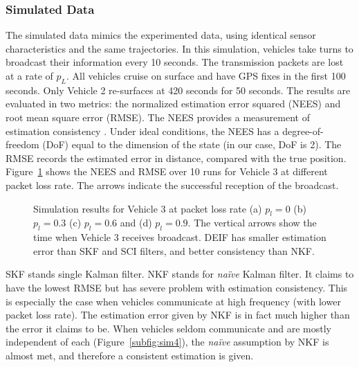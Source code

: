 \subsubsection{Simulated Data}

The simulated data mimics the experimented data, using identical sensor characteristics and the same trajectories. In this simulation, vehicles take turns to broadcast their information every 10 seconds. The transmission packets are lost at a rate of $p_L$. All vehicles cruise on surface and have GPS fixes in the first 100 seconds. Only Vehicle 2 re-surfaces at 420 seconds for 50 seconds. The results are evaluated in two metrics: the normalized estimation error squared (NEES) and root mean square error (RMSE). The NEES provides a measurement of estimation consistency \cite{Bar-shalom-yellow}. Under ideal conditions, the NEES has a degree-of-freedom (DoF) equal to the dimension of the state (in our case, DoF is 2). The RMSE records the estimated error in distance, compared with the true position. Figure~\ref{fig:simulation} shows the NEES and RMSE over 10 runs for Vehicle 3 at different packet loss rate. The arrows indicate the successful reception of the broadcast.

\begin{figure}[htbp]
\begin{center}
\caption{Simulation results for Vehicle 3 at packet loss rate (a) $p_l=0$ (b) $p_l=0.3$ (c) $p_l=0.6$ and (d) $p_l=0.9$. The vertical arrows show the time when Vehicle 3 receives broadcast. DEIF  has smaller estimation error than SKF and SCI filters, and better consistency than NKF.}
\label{fig:simulation}
\end{center}
\end{figure}

SKF stands single Kalman filter. NKF stands for \textit{na\"ive} Kalman filter. It claims to have the lowest RMSE but has severe problem with estimation consistency. This is especially the case when vehicles communicate at high frequency (with lower packet loss rate). The estimation error given by NKF is in fact much higher than the error it claims to be. When vehicles seldom communicate and are mostly independent of each (Figure~\ref{subfig:sim4}), the \textit{na\"ive} assumption by NKF is almost met, and therefore a consistent estimation is given.

